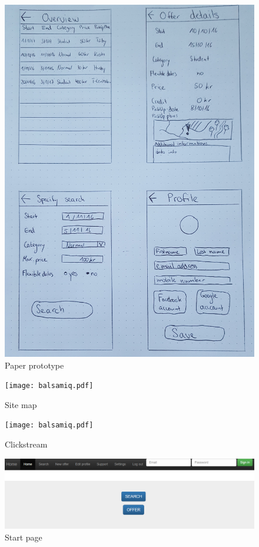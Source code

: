 \documentclass[11pt,twoside,a4paper]{report}
\begin{document}
\begin{appendices}
\begin{figure}
	\centering
	\includegraphics[width=\textwidth]{paper-prototype-2.jpg}
	\caption{Paper prototype}
	\label{figure:paper-prototype-2}
\end{figure}

\begin{figure}
	\centering
	\texttt{[image: balsamiq.pdf]}
	\caption{Site map}
	\label{figure:site-map}
\end{figure}

\begin{figure}
	\centering
	\texttt{[image: balsamiq.pdf]}
	\caption{Clickstream}
	\label{figure:clickstream}
\end{figure}

\begin{figure}
	\centering
	\includegraphics[width=\textwidth]{webapp-start.png}
	\caption{Start page}
	\label{figure:start-page}
\end{figure}


\end{appendices}
\end{document}

